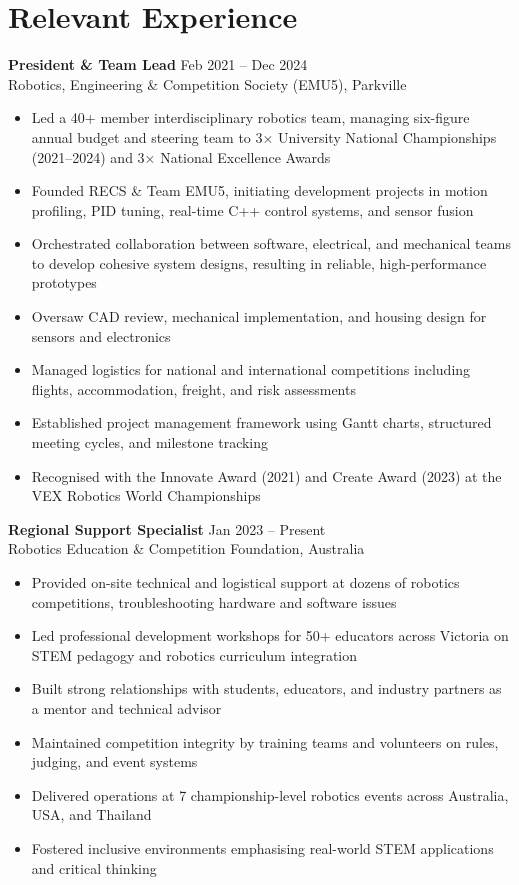 \documentclass[11pt]{article}
\begin{document}
\section*{Relevant Experience}

\textbf{President \& Team Lead} \hfill Feb 2021 -- Dec 2024\\
Robotics, Engineering \& Competition Society (EMU5), Parkville
\begin{itemize}
\item Led a 40+ member interdisciplinary robotics team, managing six-figure annual budget and steering team to 3× University National Championships (2021–2024) and 3× National Excellence Awards
\item Founded RECS \& Team EMU5, initiating development projects in motion profiling, PID tuning, real-time C++ control systems, and sensor fusion
\item Orchestrated collaboration between software, electrical, and mechanical teams to develop cohesive system designs, resulting in reliable, high-performance prototypes
\item Oversaw CAD review, mechanical implementation, and housing design for sensors and electronics
\item Managed logistics for national and international competitions including flights, accommodation, freight, and risk assessments
\item Established project management framework using Gantt charts, structured meeting cycles, and milestone tracking
\item Recognised with the Innovate Award (2021) and Create Award (2023) at the VEX Robotics World Championships
\end{itemize}

\textbf{Regional Support Specialist} \hfill Jan 2023 -- Present\\
Robotics Education \& Competition Foundation, Australia
\begin{itemize}
\item Provided on-site technical and logistical support at dozens of robotics competitions, troubleshooting hardware and software issues
\item Led professional development workshops for 50+ educators across Victoria on STEM pedagogy and robotics curriculum integration
\item Built strong relationships with students, educators, and industry partners as a mentor and technical advisor
\item Maintained competition integrity by training teams and volunteers on rules, judging, and event systems
\item Delivered operations at 7 championship-level robotics events across Australia, USA, and Thailand
\item Fostered inclusive environments emphasising real-world STEM applications and critical thinking
\end{itemize}
\end{document}
